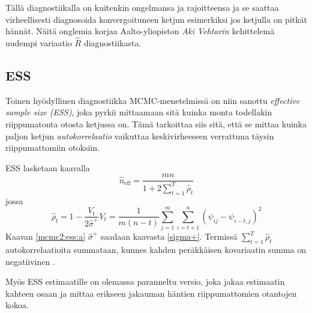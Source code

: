 Tällä diagnostiikalla on kuitenkin ongelmansa ja rajoitteensa ja se saattaa virheellisesti diagnosoida konvergoituneen ketjun esimerkiksi jos ketjulla on pitkät hännät. Näitä onglemia korjaa Aalto-yliopiston \emph{Aki Vehtarin} kehittelemä uudempi variaatio $\hat{R}$ diagnostiikasta. \cite{vehtari_2019}

\subsection{ESS}

Toinen hyödyllinen diagnostiikka MCMC-menetelmissä on niin sanottu \textit{effective sample size (ESS)}, joka pyrkii mittaamaan sitä kuinka monta todellakin riippumatonta otosta ketjussa on. Tämä tarkoittaa siis sitä, että se mittaa kuinka paljon ketjun \emph{autokorrelaatio} vaikuttaa keskivirheeseen verrattuna täysin riippumattomiin otoksiin.
\begin{maar}
	ESS lasketaan kaavalla
	\begin{equation}
		\hat{n}_{\mathrm{eff}} = \frac{mn}{1+2\sum_{t=1}^{T}\hat{\rho}_t}
	\end{equation}
	jossa 
	\begin{subequations}
	\begin{equation}\label{mcmc2:ess:a}
		\hat{\rho}_t = 1 - \frac{V_t}{2\hat{\sigma}^+}
	\end{equation}
	\begin{equation}
		V_t=\frac{1}{m(n-t)}\sum_{j=1}^{m}\sum_{i=t+1}^{n}(\psi_{ij}-\psi_{i-t,j})^2
	\end{equation}
	\end{subequations}
	Kaavan \eqref{mcmc2:ess:a} $\hat{\sigma}^+$ saadaan kaavasta \eqref{sigma+}. Termissä $\sum_{t=1}^{T}\hat{\rho}_t$ autokorrelaatioita summataan, kunnes kahden peräkkäisen kovariaatin summa on negatiivinen \cite{geyer_practical_1992}.
\end{maar}

Myös ESS estimaatille on olemassa paranneltu versio, joka jakaa estimaatin kahteen osaan ja mittaa erikseen jakauman häntien riippumattomien otantojen kokoa.

















